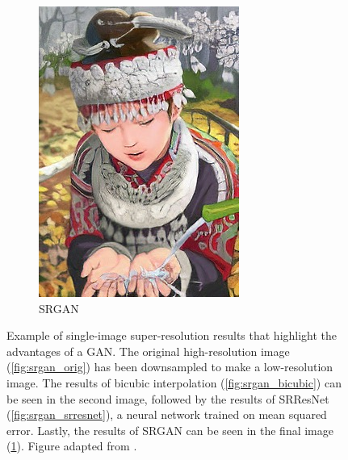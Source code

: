 \begin{figure}[t]
\begin{subfigure}{.24\linewidth}
        \includegraphics[width=\linewidth]{images/comic_SRGAN-VGG54.jpg}
        \caption{SRGAN}
        \label{fig:srgan_srgan}
    \end{subfigure}

    \caption{Example of single-image super-resolution results that highlight the advantages of a GAN. The original high-resolution image (\ref{fig:srgan_orig}) has been downsampled to make a low-resolution image. The results of bicubic interpolation (\ref{fig:srgan_bicubic}) can be seen in the second image, followed by the results of SRResNet (\ref{fig:srgan_srresnet}), a neural network trained on mean squared error. Lastly, the results of SRGAN can be seen in the final image (\ref{fig:srgan_srgan}). Figure adapted from \textcite{ledig_photo-realistic_2016}.}
    \label{fig:srgan}
\end{figure}

